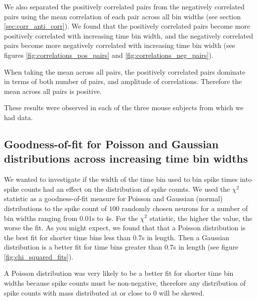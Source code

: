\documentclass[a4paper,12pt]{article}
\theoremstyle{definition}
\begin{document}
    We also separated the positively correlated pairs from the negatively correlated pairs using the mean correlation of each pair across all bin widths (see section \ref{sec:corr_anti_corr}). We found that the positively correlated pairs become more positively correlated with increasing time bin width, and the negatively correlated pairs become more negatively correlated with increasing time bin width (see figures \ref{fig:correlations_pos_pairs} and \ref{fig:correlations_neg_pairs}).

    When taking the mean across all pairs, the positively correlated pairs dominate in terms of both number of pairs, and amplitude of correlations. Therefore the mean across all pairs is positive.

    These results were observed in each of the three mouse subjects from which we had data.

    \subsection{Goodness-of-fit for Poisson and Gaussian distributions across increasing time bin widths}
    We wanted to investigate if the width of the time bin used to bin spike times into spike counts had an effect on the distribution of spike counts.  We used the $\chi^2$ statistic as a goodness-of-fit measure for Poisson and Gaussian (normal) distributions to the spike count of $100$ randomly chosen neurons for a number of bin widths ranging from $0.01$s to $4$s. For the $\chi^2$ statistic, the higher the value, the worse the fit. As you might expect, we found that that a Poisson distribution is the best fit for shorter time bins less than $0.7$s in length. Then a Gaussian distribution is a better fit for time bins greater than $0.7$s in length (see figure \ref{fig:chi_squared_fits}).

    A Poisson distribution was very likely to be a better fit for shorter time bin widths because spike counts must be non-negative, therefore any distribution of spike counts with mass distributed at or close to $0$ will be skewed.
\end{document}
